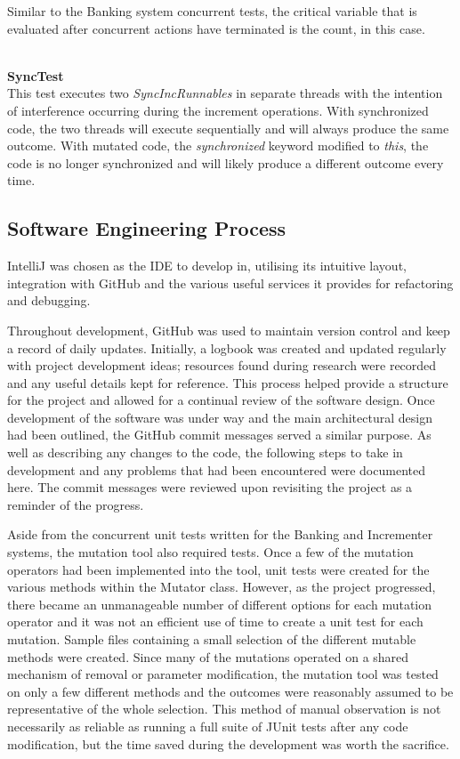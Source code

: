 \documentclass[a4paper,12pt]{article}
\begin{document}
Similar to the Banking system concurrent tests, the critical variable that is evaluated after concurrent actions have terminated is the count, in this case.   

\textbf{\\SyncTest}
\\This test executes two \textit{SyncIncRunnables} in separate threads with the intention of interference occurring during the increment operations. With synchronized code, the two threads will execute sequentially and will always produce the same outcome. With mutated code, the \textit{synchronized} keyword modified to \textit{this}, the code is no longer synchronized and will likely produce a different outcome every time.  


\subsection{Software Engineering Process}

IntelliJ was chosen as the IDE to develop in, utilising its intuitive layout, integration with GitHub and the various useful services it provides for refactoring and debugging. 
	
Throughout development, GitHub was used to maintain version control and keep a record of daily updates. Initially, a logbook was created and updated regularly with project development ideas; resources found during research were recorded and any useful details kept for reference. This process helped provide a structure for the project and allowed for a continual review of the software design. Once development of the software was under way and the main architectural design had been outlined, the GitHub commit messages served a similar purpose. As well as describing any changes to the code, the following steps to take in development and any problems that had been encountered were documented here. The commit messages were reviewed upon revisiting the project as a reminder of the progress.    

Aside from the concurrent unit tests written for the Banking and Incrementer systems, the mutation tool also required tests. Once a few of the mutation operators had been implemented into the tool, unit tests were created for the various methods within the Mutator class. However, as the project progressed, there became an unmanageable number of different options for each mutation operator and it was not an efficient use of time to create a unit test for each mutation. Sample files containing a small selection of the different mutable methods were created. Since many of the mutations operated on a shared mechanism of removal or parameter modification, the mutation tool was tested on only a few different methods and the outcomes were reasonably assumed to be representative of the whole selection. This method of manual observation is not necessarily as reliable as running a full suite of JUnit tests after any code modification, but the time saved during the development was worth the sacrifice.   
\end{document}
